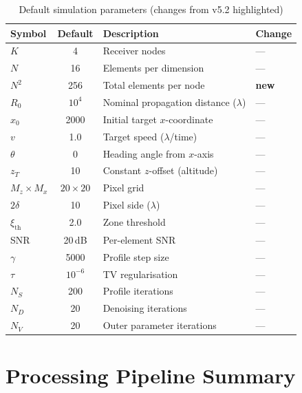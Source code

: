 \documentclass[11pt,a4paper]{article}
\begin{document}
\begin{table}[H]
\centering
\caption{Default simulation parameters (changes from v5.2
highlighted)}
\label{tab:params}
\begin{tabular}{@{}lcll@{}}
\toprule
\textbf{Symbol} & \textbf{Default} & \textbf{Description}
  & \textbf{Change} \\
\midrule
$K$ & 4 & Receiver nodes & --- \\
$N$ & 16 & Elements per dimension & --- \\
$N^2$ & 256 & Total elements per node & \textbf{new} \\
$R_0$ & $10^4$ & Nominal propagation distance ($\lambda$) & --- \\
$x_0$ & 2000 & Initial target $x$-coordinate & --- \\
$v$ & 1.0 & Target speed ($\lambda$/time) & --- \\
$\theta$ & 0 & Heading angle from $x$-axis & --- \\
$z_T$ & 10 & Constant $z$-offset (altitude) & --- \\
$M_z{\times}M_x$ & $20{\times}20$ & Pixel grid & --- \\
$2\delta$ & 10 & Pixel side ($\lambda$) & --- \\
$\xi_{\mathrm{th}}$ & 2.0 & Zone threshold & --- \\
SNR & 20\,dB & Per-element SNR & --- \\
\midrule
$\gamma$ & 5000 & Profile step size & --- \\
$\tau$ & $10^{-6}$ & TV regularisation & --- \\
$N_S$ & 200 & Profile iterations & --- \\
$N_D$ & 20 & Denoising iterations & --- \\
$N_V$ & 20 & Outer parameter iterations & --- \\
\bottomrule
\end{tabular}
\end{table}

\section{Processing Pipeline Summary}
\label{sec:pipeline}
\end{document}
